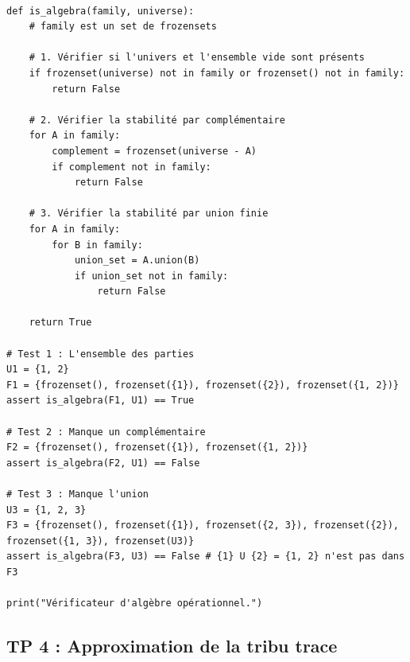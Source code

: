 \documentclass[11pt,a4paper]{article}
\begin{document}
\begin{lstlisting}

def is_algebra(family, universe):
    # family est un set de frozensets

    # 1. Vérifier si l'univers et l'ensemble vide sont présents
    if frozenset(universe) not in family or frozenset() not in family:
        return False

    # 2. Vérifier la stabilité par complémentaire
    for A in family:
        complement = frozenset(universe - A)
        if complement not in family:
            return False

    # 3. Vérifier la stabilité par union finie
    for A in family:
        for B in family:
            union_set = A.union(B)
            if union_set not in family:
                return False

    return True

# Test 1 : L'ensemble des parties
U1 = {1, 2}
F1 = {frozenset(), frozenset({1}), frozenset({2}), frozenset({1, 2})}
assert is_algebra(F1, U1) == True

# Test 2 : Manque un complémentaire
F2 = {frozenset(), frozenset({1}), frozenset({1, 2})}
assert is_algebra(F2, U1) == False

# Test 3 : Manque l'union
U3 = {1, 2, 3}
F3 = {frozenset(), frozenset({1}), frozenset({2, 3}), frozenset({2}), frozenset({1, 3}), frozenset(U3)}
assert is_algebra(F3, U3) == False # {1} U {2} = {1, 2} n'est pas dans F3

print("Vérificateur d'algèbre opérationnel.")

\end{lstlisting}


\subsection*{TP 4 : Approximation de la tribu trace}
\end{document}
